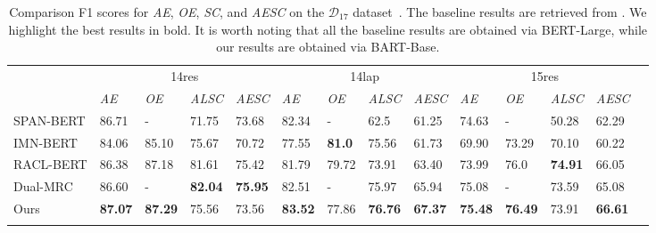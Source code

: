 \documentclass[11pt,a4paper]{article}
\begin{document}
\begin{table*}[h]
  \centering\small
  \setlength{\tabcolsep}{0.75pt}
  \renewcommand{\arraystretch}{1.3}
  \begin{tabular}{m{2.5cm}m{1.065cm}<{\centering}m{1.065cm}<{\centering}m{1.065cm}<{\centering}m{1.065cm}<{\centering}|m{1.065cm}<{\centering}m{1.065cm}<{\centering}m{1.065cm}<{\centering}m{1.065cm}<{\centering}|m{1.065cm}<{\centering}m{1.065cm}<{\centering}m{1.065cm}<{\centering}m{1.065cm}<{\centering}m{1.065cm}<{\centering}}
    \Xhline{0.08em}
  \multirow{2}{*}{Model} & \multicolumn{4}{c|}{14res}                                        & \multicolumn{4}{c|}{14lap}                                      & \multicolumn{4}{c}{15res}                                        \\
    \cline{2-13}
    & \emph{AE}            & \emph{OE}             & \emph{ALSC}             & \emph{AESC}            & \emph{AE}             & \emph{OE}          & \emph{ALSC}             & \emph{AESC}            & \emph{AE}             & \emph{OE}             & \emph{ALSC}             & \emph{AESC}           \\
    \cline{1-13}
    SPAN-BERT              & 86.71         & -              & 71.75          & 73.68          & 82.34          & -           & 62.5           & 61.25          & 74.63          & -              & 50.28          & 62.29         \\
  IMN-BERT               & 84.06         & 85.10          & 75.67          & 70.72          & 77.55          & \textbf{81.0} & 75.56          & 61.73          & 69.90          & 73.29          & 70.10          & 60.22         \\
  RACL-BERT              & 86.38         & 87.18          & 81.61          & 75.42          & 81.79          & 79.72       & 73.91          & 63.40          & 73.99          & 76.0           & \textbf{74.91} & 66.05         \\
  Dual-MRC               & 86.60         & -              & \textbf{82.04} & \textbf{75.95} & 82.51          & -           & 75.97          & 65.94          & 75.08          & -              & 73.59          & 65.08         \\
    \Xhline{0.05em}
    Ours                   & \textbf{87.07} & \textbf{87.29} & 75.56          & 73.56          & \textbf{83.52} & 77.86       & \textbf{76.76} & \textbf{67.37} & \textbf{75.48} & \textbf{76.49} & 73.91          & \textbf{66.61} \\
    \Xhline{0.08em}
  \end{tabular}
  \caption{Comparison F1 scores for  \emph{AE}, \emph{OE}, \emph{SC}, and \emph{AESC}   on the  $\mathcal{D}_{17}$ dataset~\citep{DBLP:conf/aaai/WangPDX17}. The baseline results are retrieved from \citet{DBLP:journals/corr/abs-2101-00816}. We highlight the best results in bold. It is worth noting that all the baseline results are obtained via BERT-Large, while our results are obtained via BART-Base.}
  \label{tb:wang}
  \end{table*}
\end{document}
